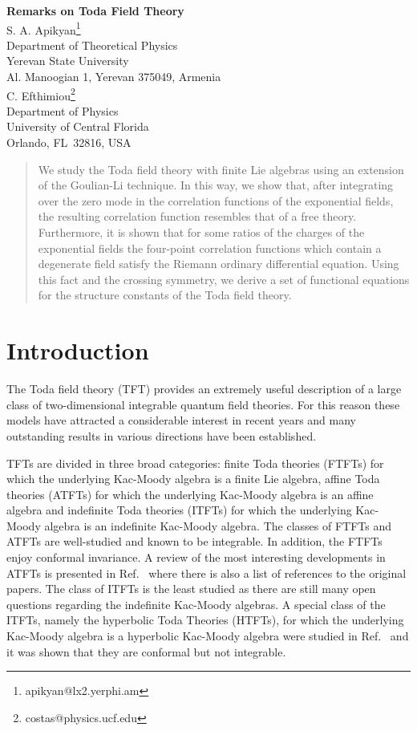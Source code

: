 \documentclass[a4paper,12pt]{article}
\begin{document}
\begin{center}
{\bfseries\Large Remarks on \coordHE{} Toda Field Theory}\\[1cm]

S. A. Apikyan\footnote{apikyan@lx2.yerphi.am}\\
Department of Theoretical Physics\\
Yerevan State University\\
Al. Manoogian 1, Yerevan 375049, Armenia\\[1cm]

C. Efthimiou\footnote{costas@physics.ucf.edu}\\
Department of Physics\\
University of Central Florida\\
Orlando, FL~32816, USA
\end{center}


\begin{abstract}
We study the Toda field theory with finite Lie algebras using an
extension of the Goulian-Li
technique. In this way, we show that, after integrating over the zero mode in the
correlation functions of the exponential fields, 
the resulting correlation function resembles that of  a free theory. 
Furthermore, it
is shown that for some ratios of the charges of the exponential fields
the four-point correlation functions which contain a
degenerate field satisfy the Riemann ordinary differential
equation. Using this fact and the crossing symmetry, we derive a set
of functional equations for the structure constants of the \coordHE{}  Toda
field theory.
\end{abstract}

\section{Introduction}
The Toda field theory (TFT) provides an extremely useful description of
a large class of two-dimensional integrable quantum field
theories. For this reason  these models have attracted a considerable interest
in recent years and many outstanding results in various directions have been 
established.

TFTs are divided in three broad categories:
finite Toda theories (FTFTs) for which the underlying Kac-Moody
algebra \cite{Kac,GO} is a finite Lie algebra,
affine Toda theories (ATFTs) for which the underlying Kac-Moody
algebra is an affine  algebra and indefinite Toda theories
(ITFTs)  for which the underlying Kac-Moody 
algebra is an indefinite Kac-Moody 
algebra. 
The classes of FTFTs and ATFTs are well-studied and known to be
integrable. In addition, the FTFTs enjoy conformal invariance.
 A review of the most
interesting developments in ATFTs is presented in Ref.~\cite{Corrigan}
where there
is also a list of references to the original papers.
The class of ITFTs is the least studied as there are still many
open questions regarding the indefinite Kac-Moody algebras. A special
class of the ITFTs, namely the hyperbolic Toda Theories (HTFTs),
for which the underlying Kac-Moody algebra is a hyperbolic Kac-Moody
algebra were studied in Ref.~\cite{GIM} and it was shown that they are
conformal but not integrable.
\end{document}
